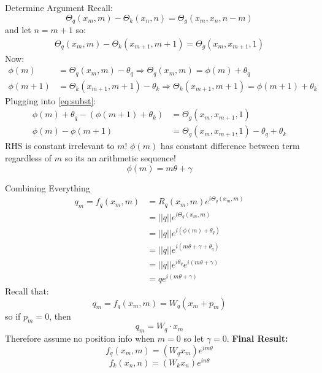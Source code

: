 \documentclass{beamer}
\begin{document}
\begin{frame}[t]{Determine Argument}
    Recall:
    \[\Theta_q(x_m, m) - \Theta_k(x_n, n) = \Theta_g(x_m, x_n, n-m)\]
    and let $n = m+1$ so:
    \begin{gather}\label{eq:subst}
    \Theta_q(x_m, m) - \Theta_k(x_{m+1}, m+1) = \Theta_g(x_m, x_{m+1}, 1)
    \end{gather}
    Now:
    \begin{align*}
       \phi(m) &= \Theta_q(x_m, m) - \theta_q \Longrightarrow \Theta_q(x_m,m) = \phi(m) + \theta_q\\ 
       \phi(m+1)&= \Theta_k(x_{m+1}, m+1) - \theta_k \Longrightarrow \Theta_k(x_{m+1}, m+1) = \phi(m+1) + \theta_k
    \end{align*}
    Plugging into \ref{eq:subst}:
    \begin{align*}
        \phi(m) + \theta_q - (\phi(m+1) + \theta_k) &= \Theta_g(x_m, x_{m+1}, 1) \\
        \phi(m) - \phi(m+1) &= \Theta_g(x_m, x_{m+1}, 1)  - \theta_q + \theta_k
    \end{align*}
    RHS is constant irrelevant to $m$! $\phi(m)$ has constant difference between term regardless of $m$ so its an arithmetic sequence!\newline
    \vspace{-1em}
    \[\phi(m) = m \theta + \gamma\]
\end{frame}

\begin{frame}[t]{Combining Everything}
    \vspace{-2.5em}
    \begin{align}
        q_m = f_q(x_m, m) &= R_q(x_m, m) e^{i \Theta_q (x_m, m)}\\
                          &= ||q|| e^{i \Theta_q (x_m, m)}\\
                          &= ||q|| e^{i (\phi(m) + \theta_q)}\\
                          &= ||q|| e^{i (m \theta + \gamma + \theta_q)}\\
                          &= ||q|| e^{i \theta_q}e^{i (m \theta + \gamma)}\\
                          &= q e^{i (m \theta + \gamma)}
    \end{align}
    Recall that:
    \[q_m = f_q(x_m, m) = W_q(x_m + p_m)\]
    so if $p_m = 0$, then
    \[ q_m = W_q \cdot x_m\]
    Therefore assume no position info when $m=0$ so let $\gamma = 0$.\newline
    \textbf{Final Result:}
    \[ f_q(x_m, m) = (W_q x_m)e^{i m \theta}\]
    \[ f_k(x_n, n) = (W_k x_n)e^{i n \theta}\]

\end{frame}
\end{document}

